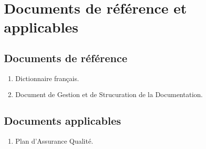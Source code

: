 
\section{Documents de référence et applicables}
    
    \subsection{Documents de référence}
    \begin{enumerate}
        \item Dictionnaire français.
        \item Document de Gestion et de Strucuration de la Documentation.
    \end{enumerate}
    \subsection{Documents applicables}
    \begin{enumerate}
        \item Plan d'Assurance Qualité.
    \end{enumerate}
